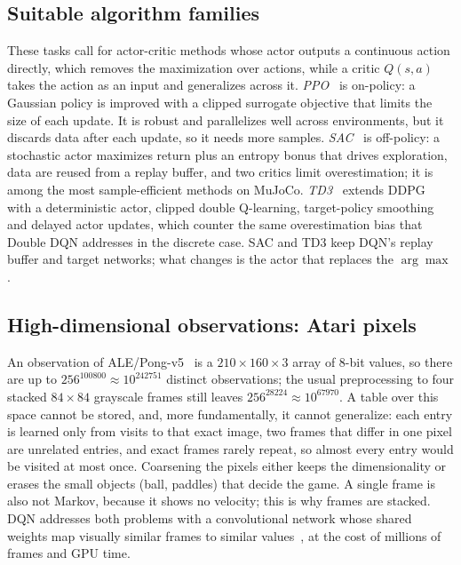 \documentclass[conference]{IEEEtran}
\begin{document}
\subsection{Suitable algorithm families}
These tasks call for actor-critic methods whose actor outputs a continuous action directly,
which removes the maximization over actions, while a critic $Q(s,a)$ takes the action as an
input and generalizes across it.
\emph{PPO}~\cite{schulman2017} is on-policy: a Gaussian policy is improved with a clipped
surrogate objective that limits the size of each update. It is robust and parallelizes
well across environments, but it discards data after each update, so it needs more samples.
\emph{SAC}~\cite{haarnoja2018} is off-policy: a stochastic actor maximizes return plus an
entropy bonus that drives exploration, data are reused from a replay buffer, and two
critics limit overestimation; it is among the most sample-efficient methods on MuJoCo.
\emph{TD3}~\cite{fujimoto2018} extends DDPG~\cite{lillicrap2016} with a deterministic actor,
clipped double Q-learning, target-policy smoothing and delayed actor updates, which counter
the same overestimation bias that Double DQN addresses in the discrete case. SAC and TD3
keep DQN's replay buffer and target networks; what changes is the actor that replaces the
$\arg\max$.

\subsection{High-dimensional observations: Atari pixels}
An observation of ALE/Pong-v5~\cite{bellemare2013} is a $210\times160\times3$ array of 8-bit
values, so there are up to $256^{100800}\approx10^{242751}$ distinct observations; the usual
preprocessing to four stacked $84\times84$ grayscale frames still leaves
$256^{28224}\approx10^{67970}$. A table over this space cannot be stored, and, more
fundamentally, it cannot generalize: each entry is learned only from visits to that exact
image, two frames that differ in one pixel are unrelated entries, and exact frames rarely
repeat, so almost every entry would be visited at most once. Coarsening the pixels either
keeps the dimensionality or erases the small objects (ball, paddles) that decide the game.
A single frame is also not Markov, because it shows no velocity; this is why frames are
stacked. DQN addresses both problems with a convolutional network whose shared weights map
visually similar frames to similar values~\cite{mnih2015}, at the cost of millions of
frames and GPU time.
\end{document}
